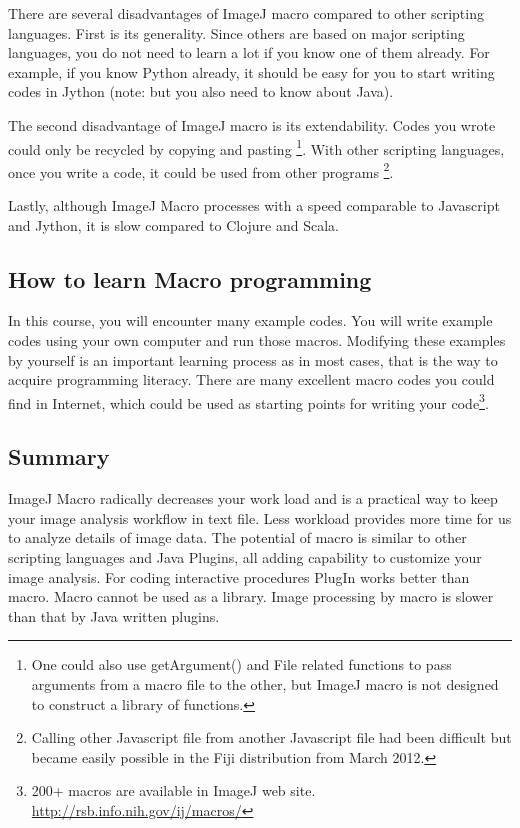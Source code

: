 \documentclass[11pt,a4paper,oneside]{report}
\begin{document}
There are several disadvantages of ImageJ macro compared to other
scripting languages. First is its generality. Since others are based on major scripting languages, you do not need to learn a lot if you know one of them already. For example, if you know Python already, 
it should be easy for you to start writing codes in Jython (note: but you also need to know about Java). 

The second disadvantage of ImageJ macro is its extendability.
Codes you wrote could only be recycled by copying and pasting
\footnote{One could also use getArgument() and File related functions to pass
arguments from a macro file to the other, but ImageJ macro is not designed to
construct a library of functions.}.
With other scripting languages, once you write a code, it could be used from other programs
\footnote{ Calling other Javascript file from another Javascript file had been difficult but became easily possible in the Fiji distribution from March 2012.}.

Lastly, although ImageJ Macro processes with a speed comparable to
Javascript and Jython, it is slow compared to Clojure and Scala. 

\subsection{How to learn Macro programming}

In this course, you will encounter many example codes. 
You will write example codes using your own computer and run those macros. 
Modifying these examples by yourself is an important learning process as in most
cases, that is the way to acquire programming literacy. There are many excellent macro codes you could find in Internet, which could be used as starting points for writing your code\footnote{200+ macros are available in ImageJ web site. 
\href{http://rsb.info.nih.gov/ij/macros/}{http://rsb.info.nih.gov/ij/macros/}}.

\subsection{Summary}
ImageJ Macro radically decreases your work load and is a practical way to keep your image analysis workflow in text file. Less workload provides more time for us to analyze details of image data. 
The potential of macro is similar to other scripting languages and Java Plugins, all adding capability to customize your image analysis. For coding interactive procedures PlugIn works better than macro. Macro cannot be used as a library.  
Image processing by macro is slower than that by Java written plugins. 
 
\end{document}
